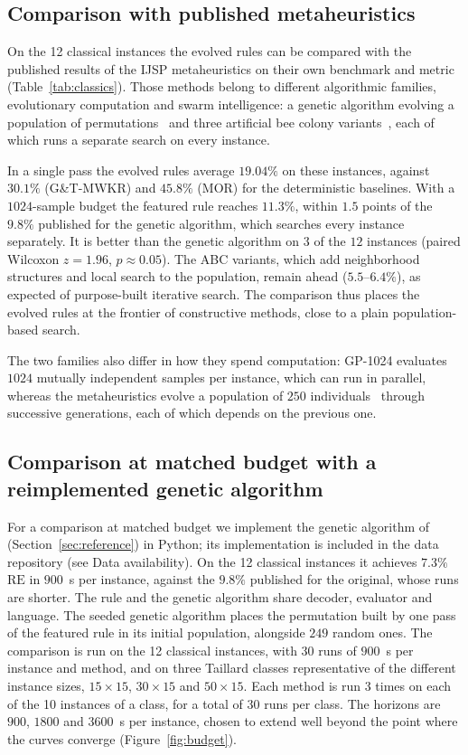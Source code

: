\documentclass[preprint,number,sort&compress,12pt]{elsarticle}
\newcommand{\RE}{\mathrm{RE}}
\begin{document}
\subsection{Comparison with published metaheuristics}
\label{sec:metaheur}
On the 12 classical instances the evolved rules can be compared with the
published results of the IJSP metaheuristics on their own benchmark and
metric (Table~\ref{tab:classics}). Those methods belong to different
algorithmic families, evolutionary computation and swarm intelligence:
a genetic algorithm evolving a population of
permutations~\citep{DiazGA2020} and three artificial bee colony
variants~\citep{DiazABC2022,DiazFEABC2023,DiazICAE2023}, each of which runs a
separate search on every instance.

In a single pass the evolved rules average $19.04\%$ on these
instances, against $30.1\%$ (G\&T-MWKR) and $45.8\%$ (MOR) for the
deterministic baselines. With a $1024$-sample budget the featured rule
reaches $11.3\%$, within $1.5$ points of the $9.8\%$ published for the
genetic algorithm, which searches every instance separately. It is
better than the genetic algorithm on $3$ of the $12$ instances (paired
Wilcoxon $z = 1.96$, $p \approx 0.05$). The ABC variants, which add neighborhood structures
and local search to the population, remain ahead ($5.5$--$6.4\%$), as
expected of purpose-built iterative search. The comparison thus places
the evolved rules at the frontier of constructive methods, close to a
plain population-based search.

The two families also differ in how they spend computation:
GP-1024 evaluates $1024$ mutually independent samples per instance,
which can run in parallel, whereas the metaheuristics evolve a
population of $250$ individuals~\citep{DiazGA2020,DiazFEABC2023} through
successive generations, each of which depends on the previous one.

\subsection{Comparison at matched budget with a reimplemented genetic
algorithm}
\label{sec:budget}
For a comparison at matched budget we implement the genetic algorithm of
\citet{DiazGA2020} (Section~\ref{sec:reference}) in Python; its
implementation is included in the data repository (see Data
availability). On the 12
classical instances it achieves $7.3\%$ $\RE$ in $900$~s per instance,
against the $9.8\%$ published for the original, whose runs are
shorter. The rule and the genetic
algorithm share decoder, evaluator and language. The seeded genetic
algorithm places the permutation built by one pass of the featured rule
in its initial population, alongside $249$ random ones. The comparison is run
on the 12 classical instances, with 30 runs of $900$~s per instance and
method, and on three Taillard classes representative of the different
instance sizes, $15{\times}15$, $30{\times}15$ and $50{\times}15$. Each method is run 3 times on each of
the 10 instances of a class, for a total of 30 runs per class. The
horizons are $900$, $1800$ and $3600$~s per instance, chosen to extend
well beyond the point where the curves converge
(Figure~\ref{fig:budget}).
\end{document}
